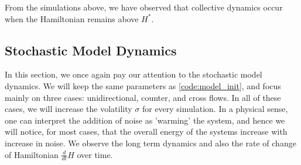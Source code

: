 From the simulations above, we have observed that collective dynamics occur when the Hamiltonian remains above $H^*$. 
\pagebreak
\subsection{Stochastic Model Dynamics}
In this section, we once again pay our attention to the stochastic model dynamics. We will keep the same parameters as \autoref{code:model_init}, and focus mainly on three cases: unidirectional, counter, and cross flows. In all of these cases, we will increase the volatility $\sigma$ for every simulation. In a physical sense, one can interpret the addition of noise as 'warming' the system, and hence we will notice, for most cases, that the overall energy of the systems increase with increase in noise. We observe the long term dynamics and also the rate of change of Hamiltonian $\frac{d}{dt}H$ over time.

